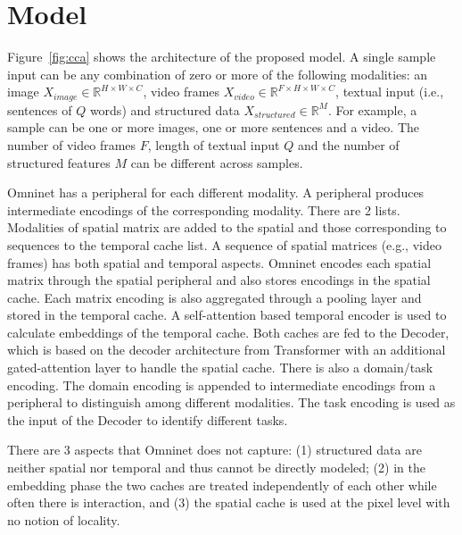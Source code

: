 \documentclass{article}
\begin{document}
\section{Model}\label{sec:model}

Figure~\ref{fig:cca} shows the architecture of the proposed model. A single sample input can be any combination of zero or more of the following modalities: an image $X_{image} \in \mathbb{R}^{H \times W \times C}$, video frames $X_{video} \in \mathbb{R}^{F \times H \times W \times C}$, textual input (i.e., sentences of $Q$ words) and structured data $X_{structured} \in \mathbb{R}^{M}$. For example, a sample can be one or more images, one or more sentences and a video. The number of video frames $F$, length of textual input $Q$ and the number of structured features $M$ can be different across samples.

Omninet has a peripheral for each different modality. A peripheral produces intermediate encodings of the corresponding modality. There are 2 lists. Modalities of spatial matrix are added to the spatial and those corresponding to sequences to the temporal cache list. A sequence of spatial matrices (e.g., video frames) has both spatial and temporal aspects. Omninet encodes each spatial matrix through the spatial peripheral and also stores encodings in the spatial cache. Each matrix encoding is also aggregated through a pooling layer and stored in the temporal cache. A self-attention based temporal encoder is used to calculate embeddings of the temporal cache. Both caches are fed to the Decoder, which is based on the decoder architecture from Transformer \cite{vaswani2017attention} with an additional gated-attention layer to handle the spatial cache. There is also a domain/task encoding. The domain encoding is appended to intermediate encodings from a peripheral to distinguish among different modalities. The task encoding is used as the input of the Decoder to identify different tasks.


There are 3 aspects that Omninet does not capture: (1) structured data are neither spatial nor temporal and thus cannot be directly modeled; (2) in the embedding phase the two caches are treated independently of each other while often there is interaction, and (3) the spatial cache is used at the pixel level with no notion of locality.
\end{document}
